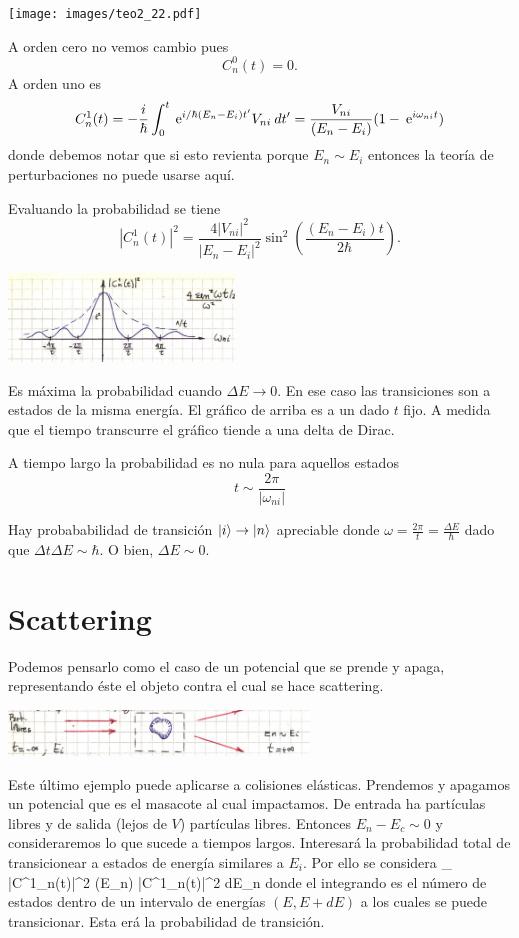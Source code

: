 \documentclass[10pt,oneside]{CBFT_book}
\begin{document}
\texttt{[image: images/teo2\_22.pdf]}

A orden cero no vemos cambio pues
\[
	C^0_n(t) = 0.
\]
A orden uno es 
\[
	C^1_n(t) = -\frac{i}{\hbar} \int_0^t \:\mathrm{e}^{i/\hbar(E_n - E_i)t'} V_{ni} \: dt'=
	\frac{V_{ni}}{(E_n - E_i)}(1-\:\mathrm{e}^{i\omega_{ni}t})
\]
donde debemos notar que si esto revienta porque $E_n \sim E_i$ entonces la teoría de
perturbaciones no puede usarse aquí.

Evaluando la probabilidad se tiene	
\[
	|C^1_n(t)|^2 = 
	\frac{4|V_{ni}|^2}{| E_n - E_i|^2}\sin^2\left(\frac{(E_n - E_i)t}{2\hbar}\right).
\]

	\includegraphics[width=0.45\textwidth]{images/fig_ft2_potencial_abrupto.jpg}

Es máxima la probabilidad cuando $\Delta E\to 0$. 
En ese caso las transiciones son a estados de la misma energía. 
El gráfico de arriba es a un dado $t$ fijo. A medida que el tiempo transcurre el gráfico
tiende a una delta de Dirac.

A tiempo largo la probabilidad es no nula para aquellos estados 
\[
	t \sim \frac{2\pi}{|\omega_{ni}|}
\]

Hay probababilidad de transición $\Ket{i} \to \Ket{n}$ apreciable donde $\omega = \frac{2\pi}{t}
= \frac{\Delta E}{\hbar}$ dado que $\Delta t \Delta E \sim \hbar $. O bien, $\Delta E \sim 0$.

\section{Scattering}

Podemos pensarlo como el caso de un potencial que se prende y apaga, representando éste el objeto
contra el cual se hace scattering.

\includegraphics[width=0.6\textwidth]{images/fig_ft2_scattering_intro.jpg}

Este último ejemplo puede aplicarse a colisiones elásticas. Prendemos y apagamos un potencial que es el 
masacote al cual impactamos. De entrada ha partículas libres y de salida (lejos de $V$) partículas libres.
Entonces $ E_n - E_c \sim 0$ y consideraremos lo que sucede a tiempos largos. Interesará la probabilidad 
total de transicionear a estados de energía similares a $E_i$. Por ello se considera 
\be
	\sum_{} |C^1_n(t)|^2 
	\longrightarrow 
	\int \: \rho(E_n) \: |C^1_n(t)|^2 \: dE_n
	\label{scattering_integral}
\ee
donde el integrando es el número de estados dentro de un intervalo de energías $(E,E+dE)$ a los cuales
se puede transicionar. Esta erá la probabilidad de transición.
\end{document}
